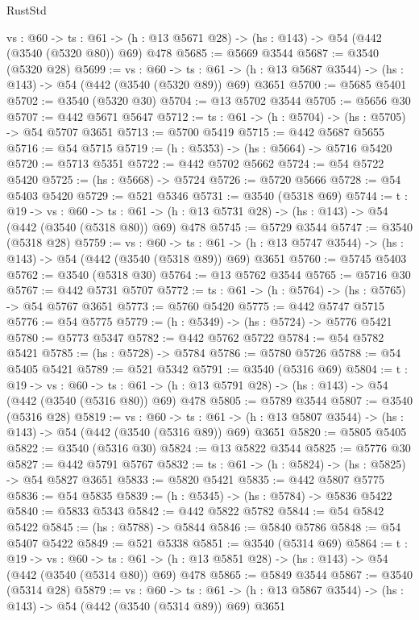 \begin{lexlean}{RustStd}
\begin{coremodule}
  {vs : @60} ->
  {ts : @61} -> (h : @13 @5671 @28) -> (hs : @143) -> @54 (@442 (@3540 (@5320 @80)) @69) @478
@5685 := @5669 @3544
@5687 := @3540 (@5320 @28)
@5699 := {vs : @60} ->
  {ts : @61} -> (h : @13 @5687 @3544) -> (hs : @143) -> @54 (@442 (@3540 (@5320 @89)) @69) @3651
@5700 := @5685 @5401
@5702 := @3540 (@5320 @30)
@5704 := @13 @5702 @3544
@5705 := @5656 @30
@5707 := @442 @5671 @5647
@5712 := {ts : @61} -> (h : @5704) -> (hs : @5705) -> @54 @5707 @3651
@5713 := @5700 @5419
@5715 := @442 @5687 @5655
@5716 := @54 @5715
@5719 := (h : @5353) -> (hs : @5664) -> @5716 @5420
@5720 := @5713 @5351
@5722 := @442 @5702 @5662
@5724 := @54 @5722 @5420
@5725 := (hs : @5668) -> @5724
@5726 := @5720 @5666
@5728 := @54 @5403 @5420
@5729 := @521 @5346
@5731 := @3540 (@5318 @69)
@5744 := {t : @19} ->
  {vs : @60} ->
  {ts : @61} -> (h : @13 @5731 @28) -> (hs : @143) -> @54 (@442 (@3540 (@5318 @80)) @69) @478
@5745 := @5729 @3544
@5747 := @3540 (@5318 @28)
@5759 := {vs : @60} ->
  {ts : @61} -> (h : @13 @5747 @3544) -> (hs : @143) -> @54 (@442 (@3540 (@5318 @89)) @69) @3651
@5760 := @5745 @5403
@5762 := @3540 (@5318 @30)
@5764 := @13 @5762 @3544
@5765 := @5716 @30
@5767 := @442 @5731 @5707
@5772 := {ts : @61} -> (h : @5764) -> (hs : @5765) -> @54 @5767 @3651
@5773 := @5760 @5420
@5775 := @442 @5747 @5715
@5776 := @54 @5775
@5779 := (h : @5349) -> (hs : @5724) -> @5776 @5421
@5780 := @5773 @5347
@5782 := @442 @5762 @5722
@5784 := @54 @5782 @5421
@5785 := (hs : @5728) -> @5784
@5786 := @5780 @5726
@5788 := @54 @5405 @5421
@5789 := @521 @5342
@5791 := @3540 (@5316 @69)
@5804 := {t : @19} ->
  {vs : @60} ->
  {ts : @61} -> (h : @13 @5791 @28) -> (hs : @143) -> @54 (@442 (@3540 (@5316 @80)) @69) @478
@5805 := @5789 @3544
@5807 := @3540 (@5316 @28)
@5819 := {vs : @60} ->
  {ts : @61} -> (h : @13 @5807 @3544) -> (hs : @143) -> @54 (@442 (@3540 (@5316 @89)) @69) @3651
@5820 := @5805 @5405
@5822 := @3540 (@5316 @30)
@5824 := @13 @5822 @3544
@5825 := @5776 @30
@5827 := @442 @5791 @5767
@5832 := {ts : @61} -> (h : @5824) -> (hs : @5825) -> @54 @5827 @3651
@5833 := @5820 @5421
@5835 := @442 @5807 @5775
@5836 := @54 @5835
@5839 := (h : @5345) -> (hs : @5784) -> @5836 @5422
@5840 := @5833 @5343
@5842 := @442 @5822 @5782
@5844 := @54 @5842 @5422
@5845 := (hs : @5788) -> @5844
@5846 := @5840 @5786
@5848 := @54 @5407 @5422
@5849 := @521 @5338
@5851 := @3540 (@5314 @69)
@5864 := {t : @19} ->
  {vs : @60} ->
  {ts : @61} -> (h : @13 @5851 @28) -> (hs : @143) -> @54 (@442 (@3540 (@5314 @80)) @69) @478
@5865 := @5849 @3544
@5867 := @3540 (@5314 @28)
@5879 := {vs : @60} ->
  {ts : @61} -> (h : @13 @5867 @3544) -> (hs : @143) -> @54 (@442 (@3540 (@5314 @89)) @69) @3651

\end{coremodule}
\end{lexlean}

